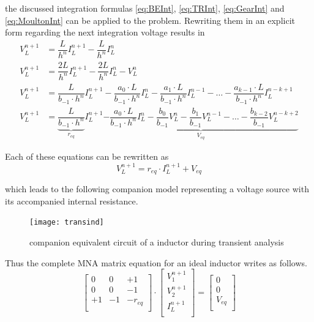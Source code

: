\documentclass[10pt]{report}
\begin{document}
the discussed integration formulas \eqref{eq:BEInt}, \eqref{eq:TRInt},
\eqref{eq:GearInt} and \eqref{eq:MoultonInt} can be applied to the
problem.  Rewriting them in an explicit form regarding the next
integration voltage results in
\begin{align}
V_L^{n+1} &= \dfrac{L}{h^{n}} I_L^{n+1} - \dfrac{L}{h^{n}} I_L^{n}\\
V_L^{n+1} &= \dfrac{2L}{h^{n}} I_L^{n+1} - \dfrac{2L}{h^{n}} I_L^{n} - V_L^n\\
V_L^{n+1} &= \dfrac{L}{b_{-1}\cdot h^{n}} I_L^{n+1} - \dfrac{a_0\cdot L}{b_{-1}\cdot h^{n}} I_L^{n} - \dfrac{a_1\cdot L}{b_{-1}\cdot h^{n}} I_L^{n-1} - \ldots - \dfrac{a_{k-1}\cdot L}{b_{-1}\cdot h^{n}} I_L^{n-k+1}\\
V_L^{n+1} &= \underbrace{\dfrac{L}{b_{-1}\cdot h^{n}}}_{r_{eq}} I_L^{n+1} \underbrace{- \dfrac{a_0\cdot L}{b_{-1}\cdot h^{n}} I_L^{n} - \dfrac{b_0}{b_{-1}} V_L^n - \dfrac{b_1}{b_{-1}} V_L^{n-1} - \ldots - \dfrac{b_{k-2}}{b_{-1}} V_L^{n-k+2}}_{V_{eq}}
\end{align}

Each of these equations can be rewritten as
\begin{equation}
V_L^{n+1} = r_{eq}\cdot I_L^{n+1} + V_{eq}
\end{equation}

which leads to the following companion model representing a voltage
source with its accompanied internal resistance.
\begin{figure}[ht]
\begin{center}
\texttt{[image: transind]}
\end{center}
\caption{companion equivalent circuit of a inductor during transient analysis}
\end{figure}
\FloatBarrier

Thus the complete MNA matrix equation for an ideal inductor writes
as follows.
\begin{equation}
\begin{bmatrix}
0 & 0 & +1\\
0 & 0 & -1\\
+1 & -1 & -r_{eq}\\
\end{bmatrix}
\cdot
\begin{bmatrix}
V_1^{n+1}\\
V_2^{n+1}\\
I_L^{n+1}\\
\end{bmatrix}
=
\begin{bmatrix}
0\\
0\\
V_{eq}\\
\end{bmatrix}
\end{equation}
\end{document}
